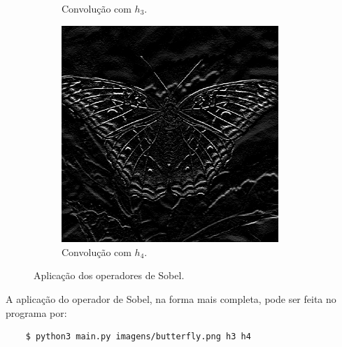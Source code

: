 \begin{figure}[H]
\begin{subfigure}{0.48\textwidth}
        \caption{Convolução com $h_3$.}
        \label{fig:sobel:x}
    \end{subfigure}%
    \begin{subfigure}{0.48\textwidth}
        \centering
        \includegraphics[width=0.9\textwidth]{resultados/butterfly_h4.png}
        \caption{Convolução com $h_4$.}
        \label{fig:sobel:y}
    \end{subfigure}

    \caption{Aplicação dos operadores de Sobel.}
    \label{fig:sobel}
\end{figure}

A aplicação do operador de Sobel, na forma mais completa, pode ser feita no programa por:

\begin{verbatim}
    $ python3 main.py imagens/butterfly.png h3 h4
\end{verbatim}
